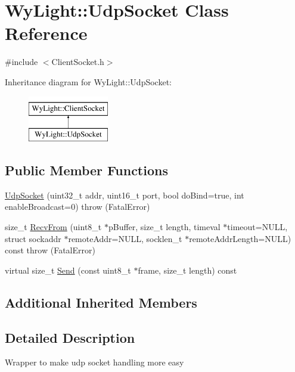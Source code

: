 \hypertarget{class_wy_light_1_1_udp_socket}{\section{Wy\-Light\-:\-:Udp\-Socket Class Reference}
\label{class_wy_light_1_1_udp_socket}
}


{\ttfamily \#include $<$Client\-Socket.\-h$>$}

Inheritance diagram for Wy\-Light\-:\-:Udp\-Socket\-:\begin{figure}[H]
\begin{center}
\leavevmode
\includegraphics[height=2.000000cm]{class_wy_light_1_1_udp_socket}
\end{center}
\end{figure}
\subsection*{Public Member Functions}
\begin{DoxyCompactItemize}
\item 
\hyperlink{class_wy_light_1_1_udp_socket_adcf1f11b78b2485b475f3b040ff8f2d4}{Udp\-Socket} (uint32\-\_\-t addr, uint16\-\_\-t port, bool do\-Bind=true, int enable\-Broadcast=0)  throw (\-Fatal\-Error)
\item 
size\-\_\-t \hyperlink{class_wy_light_1_1_udp_socket_a937cb9beb6c957e0870228815e1d2cb4}{Recv\-From} (uint8\-\_\-t $\ast$p\-Buffer, size\-\_\-t length, timeval $\ast$timeout=N\-U\-L\-L, struct sockaddr $\ast$remote\-Addr=N\-U\-L\-L, socklen\-\_\-t $\ast$remote\-Addr\-Length=N\-U\-L\-L) const   throw (\-Fatal\-Error)
\item 
virtual size\-\_\-t \hyperlink{class_wy_light_1_1_udp_socket_aaba73a044c8aed0ef0c1e44ce46d88ca}{Send} (const uint8\-\_\-t $\ast$frame, size\-\_\-t length) const 
\end{DoxyCompactItemize}
\subsection*{Additional Inherited Members}


\subsection{Detailed Description}
Wrapper to make udp socket handling more easy 


